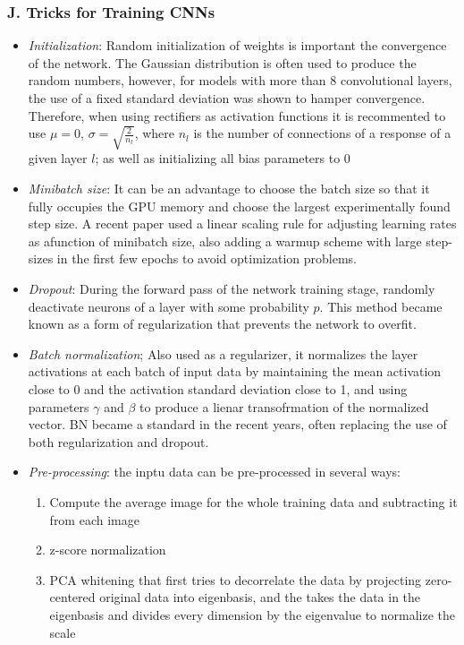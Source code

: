 \documentclass{report}
\begin{document}
\subsubsection*{J. Tricks for Training CNNs}
\begin{itemize}
    \item \textit{Initialization}: Random initialization of weights is important the convergence of the network. The Gaussian distribution is often used to produce the random numbers, however, for models with more than 8 convolutional layers, the use of a fixed standard deviation was shown to hamper convergence. Therefore, when using rectifiers as activation functions it is recommented to use $\mu = 0$, $\sigma = \sqrt{\frac{2}{n_l}}$, where $n_l$ is the number of connections of a response of a given layer $l$; as well as initializing all bias parameters to 0
    \item \textit{Minibatch size}: It can be an advantage to choose the batch size so that it fully occupies the GPU memory and choose the largest experimentally found step size. A recent paper used a linear scaling rule for adjusting learning rates as afunction of minibatch size, also adding a warmup scheme with large step-sizes in the first few epochs to avoid optimization problems.
    \item \textit{Dropout}: During the forward pass of the network training stage, randomly deactivate neurons of a layer with some probability $p$. This method became known as a form of regularization that prevents the network to overfit.
    \item \textit{Batch normalization}; Also used as a regularizer, it normalizes the layer activations at each batch of input data by maintaining the mean activation close to 0 and the activation standard deviation close to 1, and using parameters $\gamma$ and $\beta$ to produce a lienar transofrmation of the normalized vector. BN became a standard in the recent years, often replacing the use of both regularization and dropout.
    \item \textit{Pre-processing}: the inptu data can be pre-processed in several ways:
    \begin{enumerate}
        \item Compute the average image for the whole training data and subtracting it from each image
        \item z-score normalization
        \item PCA whitening that first tries to decorrelate the data by projecting zero-centered original data into eigenbasis, and the takes the data in the eigenbasis and divides every dimension by the eigenvalue to normalize the scale
    \end{enumerate}
\end{itemize}
\end{document}
